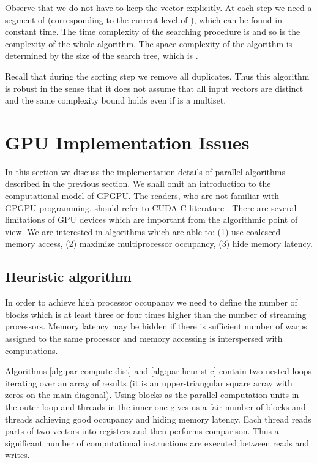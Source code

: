 \documentclass[a4paper]{article}
\begin{document}
Observe that we do not have to keep the vector  explicitly. At each step we need a segment of  (corresponding to the current level of ), which can be found in constant time.
The time complexity of the searching procedure is  and so is the complexity of the whole algorithm. The space complexity of the algorithm is determined by the size of the search tree, which is .

Recall that during the sorting step we remove all duplicates. Thus this algorithm is robust in the sense that it does not assume that all input vectors are distinct and the same complexity bound holds even if  is a multiset. 

\section{GPU Implementation Issues} \label{sec:implissues}

In this section we discuss the implementation details of parallel algorithms described in the previous section. We shall omit an introduction to the computational model of GPGPU. The readers, who are not familiar with GPGPU programming, should refer to CUDA C literature \cite{cuda-best-practices,kirk2012programming}.
There are several limitations of GPU devices which are important from the algorithmic point of view. We are interested in algorithms which are able to:
(1) use coalesced memory access,
(2) maximize multiprocessor occupancy,
(3) hide memory latency.








\subsection{Heuristic algorithm}

In order to achieve high processor occupancy we need to define the number of blocks which is at least three or four times higher than the number of streaming processors. Memory latency may be hidden if there is sufficient number of warps assigned to the same processor and memory accessing is interspersed with computations. 

Algorithms \ref{alg:par-compute-dist} and \ref{alg:par-heuristic} contain two nested loops iterating over an array of results (it is an upper-triangular square array with zeros on the main diagonal). Using blocks as the parallel computation units in the outer loop and threads in the inner one gives us a fair number of blocks and threads achieving good occupancy and hiding memory latency. Each thread reads parts of two vectors into registers and then performs comparison. Thus a significant number of computational instructions are executed between reads and writes. 
\end{document}

